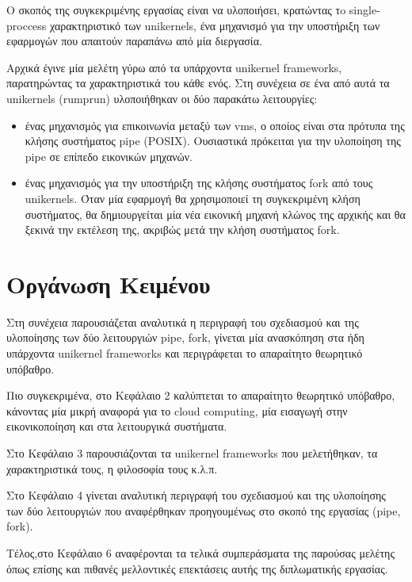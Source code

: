 Ο σκοπός της συγκεκριμένης εργασίας είναι να υλοποιήσει, κρατώντας τo
single-proccess χαρακτηριστικό των unikernels, ένα μηχανισμό για την υποστήριξη
των εφαρμογών που απαιτούν παραπάνω από μία διεργασία. 

Αρχικά έγινε μία μελέτη γύρω από τα υπάρχοντα unikernel frameworks, παρατηρώντας
τα χαρακτηριστικά του κάθε ενός. Στη συνέχεια σε ένα από αυτά τα unikernels
(rumprun) υλοποιήθηκαν οι δύο παρακάτω λειτουργίες:

\begin{itemize}
\item ένας μηχανισμός για επικοινωνία μεταξύ των vms, ο οποίος είναι στα πρότυπα
της κλήσης συστήματος pipe (POSIX). Ουσιαστικά πρόκειται για την υλοποίηση της
pipe σε επίπεδο εικονικών μηχανών. 
\item  ένας μηχανισμός για την υποστήριξη της κλήσης συστήματος fork από τους
unikernels. Όταν μία εφαρμογή θα χρησιμοποιεί τη συγκεκριμένη κλήση συστήματος,
θα δημιουργείται μία νέα εικονική μηχανή κλώνος της αρχικής και θα ξεκινά την
εκτέλεση της, ακριβώς μετά την κλήση συστήματος fork.
\end{itemize}

\section{Οργάνωση Κειμένου}
Στη συνέχεια παρουσιάζεται αναλυτικά η περιγραφή του σχεδιασμού και της
υλοποίησης των δύο λειτουργιών pipe, fork, γίνεται μία ανασκόπηση στα ήδη
υπάρχοντα unikernel frameworks και περιγράφεται το απαραίτητο θεωρητικό υπόβαθρο.

Πιο συγκεκριμένα, στο Κεφάλαιο 2 καλύπτεται το απαραίτητο θεωρητικό υπόβαθρο,
κάνοντας μία μικρή αναφορά για το cloud computing, μία εισαγωγή στην εικονικοποίηση και στα λειτουργικά συστήματα.

Στο Κεφάλαιο 3 παρουσιάζονται τα unikernel frameworks που μελετήθηκαν, τα
χαρακτηριστικά τους, η φιλοσοφία τους κ.λ.π.

Στο Κεφάλαιο 4 γίνεται αναλυτική περιγραφή του σχεδιασμού και της υλοποίησης των
δύο λειτουργιών που αναφέρθηκαν προηγουμένως στο σκοπό της εργασίας (pipe,
fork).

Τέλος,στο Κεφάλαιο 6 αναφέρονται τα τελικά συμπεράσματα της παρούσας μελέτης
όπως επίσης και πιθανές μελλοντικές επεκτάσεις αυτής της διπλωματικής εργασίας.
